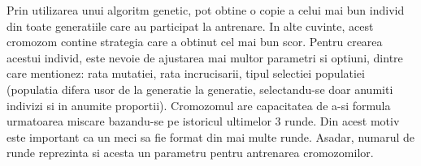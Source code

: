 Prin utilizarea unui algoritm genetic, pot obtine o copie a celui mai bun individ din toate generatiile care au participat la antrenare. In alte cuvinte, acest cromozom contine strategia care a obtinut cel mai bun scor. Pentru crearea acestui individ, este nevoie de ajustarea mai multor parametri si optiuni, dintre care mentionez: rata mutatiei, rata incrucisarii, tipul selectiei populatiei (populatia difera usor de la generatie la generatie, selectandu-se doar anumiti indivizi si in anumite proportii). Cromozomul are capacitatea de a-si formula urmatoarea miscare bazandu-se pe istoricul ultimelor 3 runde. Din acest motiv este important ca un meci sa fie format din mai multe runde. Asadar, numarul de runde reprezinta si acesta un parametru pentru antrenarea cromozomilor. 


\hfill \break
\hfill \break

\clearpage